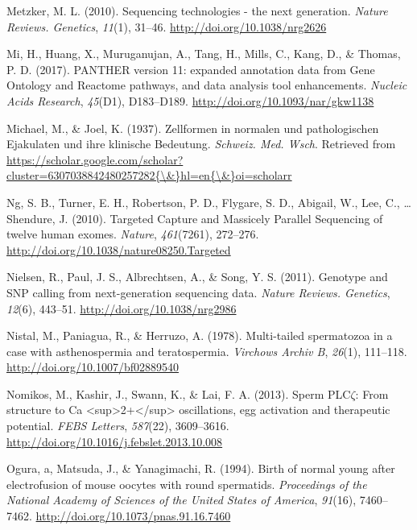 \documentclass[12pt,twoside]{reedthesis}
\theoremstyle{definition}
\theoremstyle{definition}
\theoremstyle{remark}
\begin{document}
  \hypertarget{ref-Metzker2010}{}
  Metzker, M. L. (2010). Sequencing technologies - the next generation.
  \emph{Nature Reviews. Genetics}, \emph{11}(1), 31--46.
  \url{http://doi.org/10.1038/nrg2626}
  
  \hypertarget{ref-Mi2017}{}
  Mi, H., Huang, X., Muruganujan, A., Tang, H., Mills, C., Kang, D., \&
  Thomas, P. D. (2017). PANTHER version 11: expanded annotation data from
  Gene Ontology and Reactome pathways, and data analysis tool
  enhancements. \emph{Nucleic Acids Research}, \emph{45}(D1), D183--D189.
  \url{http://doi.org/10.1093/nar/gkw1138}
  
  \hypertarget{ref-Michael1937}{}
  Michael, M., \& Joel, K. (1937). Zellformen in normalen und
  pathologischen Ejakulaten und ihre klinische Bedeutung. \emph{Schweiz.
  Med. Wsch}. Retrieved from
  \href{https://scholar.google.com/scholar?cluster=6307038842480257282\%7B/\&\%7Dhl=en\%7B/\&\%7Doi=scholarr}{https://scholar.google.com/scholar?cluster=6307038842480257282\{\textbackslash{}\&\}hl=en\{\textbackslash{}\&\}oi=scholarr}
  
  \hypertarget{ref-Ng2010}{}
  Ng, S. B., Turner, E. H., Robertson, P. D., Flygare, S. D., Abigail, W.,
  Lee, C., \ldots{} Shendure, J. (2010). Targeted Capture and Massicely
  Parallel Sequencing of twelve human exomes. \emph{Nature},
  \emph{461}(7261), 272--276.
  \url{http://doi.org/10.1038/nature08250.Targeted}
  
  \hypertarget{ref-Nielsen2011}{}
  Nielsen, R., Paul, J. S., Albrechtsen, A., \& Song, Y. S. (2011).
  Genotype and SNP calling from next-generation sequencing data.
  \emph{Nature Reviews. Genetics}, \emph{12}(6), 443--51.
  \url{http://doi.org/10.1038/nrg2986}
  
  \hypertarget{ref-Nistal}{}
  Nistal, M., Paniagua, R., \& Herruzo, A. (1978). Multi-tailed
  spermatozoa in a case with asthenospermia and teratospermia.
  \emph{Virchows Archiv B}, \emph{26}(1), 111--118.
  \url{http://doi.org/10.1007/bf02889540}
  
  \hypertarget{ref-Nomikos2013}{}
  Nomikos, M., Kashir, J., Swann, K., \& Lai, F. A. (2013). Sperm
  PLC\(\zeta\): From structure to Ca
  \textless{}sup\textgreater{}2+\textless{}/sup\textgreater{}
  oscillations, egg activation and therapeutic potential. \emph{FEBS
  Letters}, \emph{587}(22), 3609--3616.
  \url{http://doi.org/10.1016/j.febslet.2013.10.008}
  
  \hypertarget{ref-Ogura1994}{}
  Ogura, a, Matsuda, J., \& Yanagimachi, R. (1994). Birth of normal young
  after electrofusion of mouse oocytes with round spermatids.
  \emph{Proceedings of the National Academy of Sciences of the United
  States of America}, \emph{91}(16), 7460--7462.
  \url{http://doi.org/10.1073/pnas.91.16.7460}
  
\end{document}
